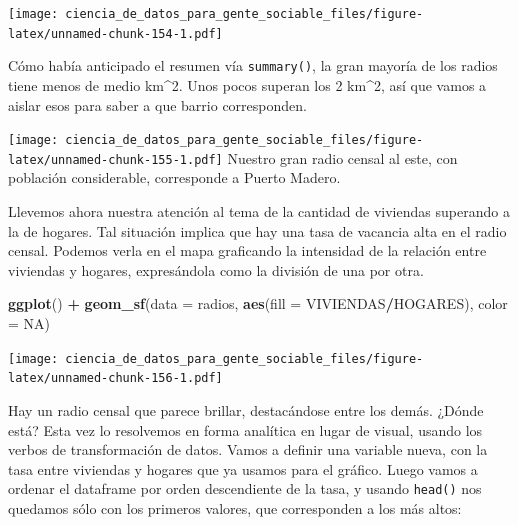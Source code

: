\documentclass[spanish,]{book}
\newenvironment{Shaded}{\begin{snugshade}}{\end{snugshade}}
\newcommand{\DataTypeTok}[1]{\textcolor[rgb]{0.13,0.29,0.53}{#1}}
\newcommand{\DecValTok}[1]{\textcolor[rgb]{0.00,0.00,0.81}{#1}}
\newcommand{\KeywordTok}[1]{\textcolor[rgb]{0.13,0.29,0.53}{\textbf{#1}}}
\newcommand{\NormalTok}[1]{#1}
\newcommand{\OperatorTok}[1]{\textcolor[rgb]{0.81,0.36,0.00}{\textbf{#1}}}
\newcommand{\OtherTok}[1]{\textcolor[rgb]{0.56,0.35,0.01}{#1}}
\newcommand{\StringTok}[1]{\textcolor[rgb]{0.31,0.60,0.02}{#1}}
\begin{document}
\texttt{[image: ciencia\_de\_datos\_para\_gente\_sociable\_files/figure-latex/unnamed-chunk-154-1.pdf]}

Cómo había anticipado el resumen vía \texttt{summary()}, la gran mayoría de los radios tiene menos de medio km\^{}2. Unos pocos superan los 2 km\^{}2, así que vamos a aislar esos para saber a que barrio corresponden.

\begin{Shaded}
\end{Shaded}

\texttt{[image: ciencia\_de\_datos\_para\_gente\_sociable\_files/figure-latex/unnamed-chunk-155-1.pdf]}
Nuestro gran radio censal al este, con población considerable, corresponde a Puerto Madero.

Llevemos ahora nuestra atención al tema de la cantidad de viviendas superando a la de hogares. Tal situación implica que hay una tasa de vacancia alta en el radio censal. Podemos verla en el mapa graficando la intensidad de la relación entre viviendas y hogares, expresándola como la división de una por otra.

\begin{Shaded}
\begin{Highlighting}[]
\KeywordTok{ggplot}\NormalTok{() }\OperatorTok{+}\StringTok{ }\KeywordTok{geom_sf}\NormalTok{(}\DataTypeTok{data =}\NormalTok{ radios, }\KeywordTok{aes}\NormalTok{(}\DataTypeTok{fill =}\NormalTok{ VIVIENDAS}\OperatorTok{/}\NormalTok{HOGARES), }\DataTypeTok{color =} \OtherTok{NA}\NormalTok{)}
\end{Highlighting}
\end{Shaded}

\texttt{[image: ciencia\_de\_datos\_para\_gente\_sociable\_files/figure-latex/unnamed-chunk-156-1.pdf]}

Hay un radio censal que parece brillar, destacándose entre los demás. ¿Dónde está? Esta vez lo resolvemos en forma analítica en lugar de visual, usando los verbos de transformación de datos. Vamos a definir una variable nueva, con la tasa entre viviendas y hogares que ya usamos para el gráfico. Luego vamos a ordenar el dataframe por orden descendiente de la tasa, y usando \texttt{head()} nos quedamos sólo con los primeros valores, que corresponden a los más altos:
\end{document}
